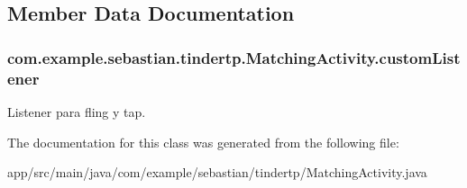 \subsection{Member Data Documentation}
\subsubsection[{\texorpdfstring{custom\+Listener}{customListener}}]{ com.\+example.\+sebastian.\+tindertp.\+Matching\+Activity.\+custom\+Listener\hspace{0.3cm}{\ttfamily [private]}}\hypertarget{classcom_1_1example_1_1sebastian_1_1tindertp_1_1MatchingActivity_af682ff57645185f224a00c986547efe0}{}\label{classcom_1_1example_1_1sebastian_1_1tindertp_1_1MatchingActivity_af682ff57645185f224a00c986547efe0}
Listener para fling y tap. 

The documentation for this class was generated from the following file\+:\begin{DoxyCompactItemize}
\item 
app/src/main/java/com/example/sebastian/tindertp/Matching\+Activity.\+java\end{DoxyCompactItemize}
